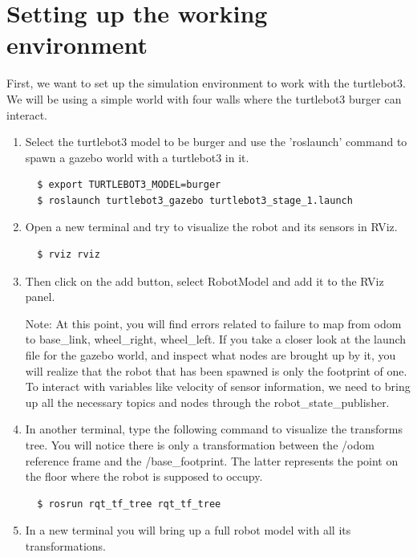 \documentclass[12pt]{article}
\begin{document}
\section{Setting up the working environment}
First, we want to set up the simulation environment to work with the turtlebot3. We will be using a simple world with four walls where the turtlebot3 burger can interact.
\begin{enumerate}

\item Select the turtlebot3 model to be burger and use the 'roslaunch' command to spawn a gazebo world with a turtlebot3 in it. 
\begin{verbatim}
  $ export TURTLEBOT3_MODEL=burger
  $ roslaunch turtlebot3_gazebo turtlebot3_stage_1.launch
\end{verbatim}

\item Open a new terminal and try to visualize the robot and its sensors in RViz. 

\begin{verbatim}
  $ rviz rviz
\end{verbatim}

\item Then click on the add button, select RobotModel and add it to the RViz panel.

Note: At this point, you will find errors related to failure to map from odom to base\_link, wheel\_right, wheel\_left.
If you take a closer look at the launch file for the gazebo world, and inspect what nodes are brought up by it, you will realize that the robot that has been spawned is only the footprint of one. To interact with variables like velocity of sensor information, we need to bring up all the necessary topics and nodes through the robot\_state\_publisher.

\item In another terminal, type the following command to visualize the transforms tree. You will notice there is only a transformation between the /odom reference frame and the /base\_footprint. The latter represents the point on the floor where the robot is supposed to occupy.

\begin{verbatim}
  $ rosrun rqt_tf_tree rqt_tf_tree
\end{verbatim}

\item In a new terminal you will bring up a full robot model with all its transformations. 


\end{enumerate}
\end{document}
